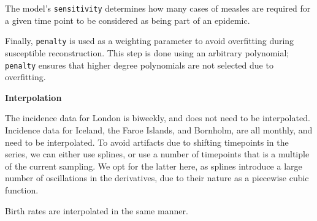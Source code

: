 \documentclass[letterpaper,10pt,english]{/Users/qcaudron/anaconda/lib/python2.7/site-packages/Sphinx-1.2b1-py2.7.egg/sphinx/texinputs/sphinxhowto}
\begin{document}
The model's \texttt{sensitivity} determines how many cases of measles
are required for a given time point to be considered as being part of an
epidemic.

Finally, \texttt{penalty} is used as a weighting parameter to avoid
overfitting during susceptible reconstruction. This step is done using
an arbitrary polynomial; \texttt{penalty} ensures that higher degree
polynomials are not selected due to overfitting.

\textbf{Interpolation}

The incidence data for London is biweekly, and does not need to be
interpolated. Incidence data for Iceland, the Faroe Islands, and
Bornholm, are all monthly, and need to be interpolated. To avoid
artifacts due to shifting timepoints in the series, we can either use
splines, or use a number of timepoints that is a multiple of the current
sampling. We opt for the latter here, as splines introduce a large
number of oscillations in the derivatives, due to their nature as a
piecewise cubic function.

Birth rates are interpolated in the same manner.

\end{document}
